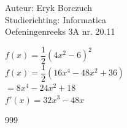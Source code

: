 \documentclass[a4paper]{article}
\begin{document}
  
\noindent \large Auteur: Eryk Borczuch \\
\noindent \large Studierichting: Informatica\\
\noindent \large Oefeningenreeks 3A nr. 20.11\\

\medskip

\normalsize

$f(x) = \dfrac{1}{2}(4x^2-6)^2$\\

$f(x) = \dfrac{1}{2}(16x^4-48x^2+36)$\\

$= 8x^4 -24x^2+18$\\

$f'(x) = 32x^3 -48x$\\

\begin{thebibliography}{999}
\end{thebibliography}
\end{document}
